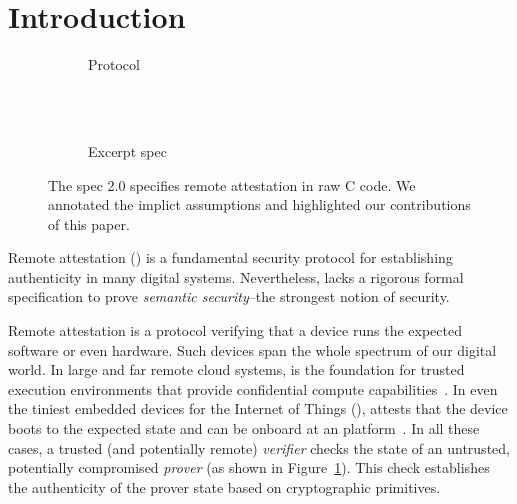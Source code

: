 \section{Introduction}
\label{sec:intro}

\begin{figure}
  \begin{subfigure}[b]{\columnwidth}
    \centering
    
    \caption{Protocol}
    \label{fig:problem:prot}
  \end{subfigure}
\\
\\
  \begin{subfigure}[b]{\columnwidth}
    \centering
	  
    \caption{Excerpt  spec}
    \label{fig:problem:spec}
  \end{subfigure}

	  \caption{
      The \tpm spec 2.0 specifies remote attestation
      in raw C code.
      We annotated the implict assumptions and
      highlighted our contributions of this paper.
  }
  \label{fig:problem}
\end{figure}



%
Remote attestation (\ra) is a fundamental security protocol for establishing authenticity in many digital systems. 
%
Nevertheless, \ra lacks a rigorous formal specification to
prove \emph{semantic security}--the strongest notion of security.
%
%

Remote attestation is a protocol verifying that a device runs
the expected software or even hardware.
%
Such devices span the whole spectrum of our digital world.
%
In large and far remote cloud systems, \ra is the foundation for
trusted execution environments that provide confidential
compute capabilities~\cite{10.1145/2872887.2750422,10.1145/3319535.3354220,10.1145/3319535.3354216}.
%
In even the tiniest embedded devices for the Internet of Things (\iot),
\ra attests that the device boots to the expected state and
can be onboard at an \iot platform~\cite{10.1145/2592798.2592824,10.1145/2897937.2898083,10.1145/3654661}.
%
In all these cases, a trusted (and potentially remote) \emph{verifier}
checks the state of an untrusted, potentially compromised \emph{prover} (as shown in Figure~\ref{fig:problem:prot}).
%
This check establishes the authenticity of the prover state based on
cryptographic primitives.
%

